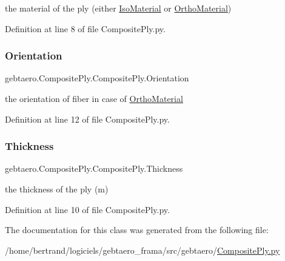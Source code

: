 the material of the ply (either \hyperlink{namespacegebtaero_1_1_iso_material}{Iso\+Material} or \hyperlink{namespacegebtaero_1_1_ortho_material}{Ortho\+Material}) 



Definition at line 8 of file Composite\+Ply.\+py.

\mbox{\label{classgebtaero_1_1_composite_ply_1_1_composite_ply_a17a90c6f267e88387ac5c06a3dad1cc7}} 
\subsubsection{\texorpdfstring{Orientation}{Orientation}}
{\footnotesize\ttfamily gebtaero.\+Composite\+Ply.\+Composite\+Ply.\+Orientation}



the orientation of fiber in case of \hyperlink{namespacegebtaero_1_1_ortho_material}{Ortho\+Material} 



Definition at line 12 of file Composite\+Ply.\+py.

\mbox{\label{classgebtaero_1_1_composite_ply_1_1_composite_ply_a0356871876ebf481a0d252f6db1171da}} 
\subsubsection{\texorpdfstring{Thickness}{Thickness}}
{\footnotesize\ttfamily gebtaero.\+Composite\+Ply.\+Composite\+Ply.\+Thickness}



the thickness of the ply (m) 



Definition at line 10 of file Composite\+Ply.\+py.



The documentation for this class was generated from the following file\+:\begin{DoxyCompactItemize}
\item 
/home/bertrand/logiciels/gebtaero\+\_\+frama/src/gebtaero/\hyperlink{_composite_ply_8py}{Composite\+Ply.\+py}\end{DoxyCompactItemize}
